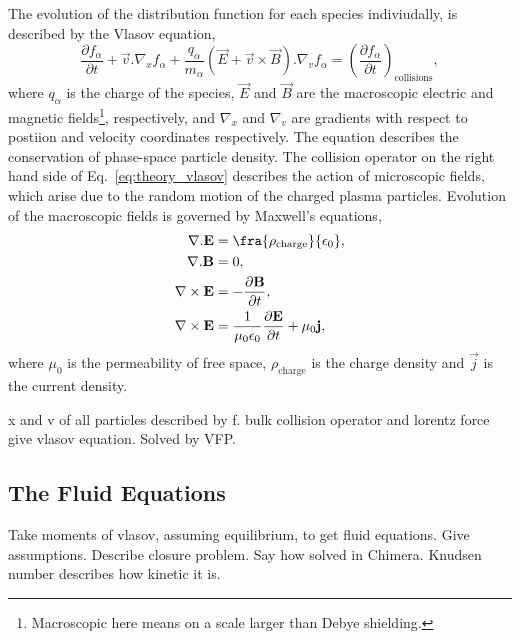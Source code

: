 The evolution of the distribution function for each species indiviudally, is described by the Vlasov equation,
\begin{equation}
    \label{eq:theory_vlasov}
    \frac{\partial f_\alpha}{\partial t} + \vec{v}.\nabla_x f_\alpha + \frac{q_\alpha}{m_\alpha} (\vec{E} + \vec{v}\times\vec{B}) . \nabla_v f_\alpha = \left ( \frac{\partial f_\alpha}{\partial t} \right )_\text{collisions},
\end{equation}
where $q_\alpha$ is the charge of the species, $\vec{E}$ and $\vec{B}$ are the macroscopic electric and magnetic fields\footnote{Macroscopic here means on a scale larger than Debye shielding.}, respectively, and $\nabla_x$ and $\nabla_v$ are gradients with respect to postiion and velocity coordinates respectively.
The equation describes the conservation of phase-space particle density.
The collision operator on the right hand side of Eq.~\ref{eq:theory_vlasov} describes the action of microscopic fields, which arise due to the random motion of the charged plasma particles.
Evolution of the macroscopic fields is governed by Maxwell's equations,
\begin{align}
    \label{eq:theory_maxwell_eqs}
    \nabla.\vec{E} &= \fra{\rho_{\text{charge}}}{\epsilon_0},\\
    \nabla.\vec{B} &= 0,\\
    \nabla \times \vec{E} &= -\frac{\partial \vec{B}}{\partial t},\\
    \nabla \times \vec{E} &= \frac{1}{\mu_0 \epsilon_0}\frac{\partial \vec{E}}{\partial t} + \mu_0 \vec{j},\\
\end{align}
where $\mu_0$ is the permeability of free space, $\rho_{\text{charge}}$ is the charge density and $\vec{j}$ is the current density.

x and v of all particles described by f.
bulk collision operator and lorentz force give vlasov equation.
Solved by VFP.

\subsection{The Fluid Equations}%
\label{sec:theory_fluid}

Take moments of vlasov, assuming equilibrium, to get fluid equations.
Give assumptions.
Describe closure problem.
Say how solved in Chimera.
Knudsen number describes how kinetic it is.


